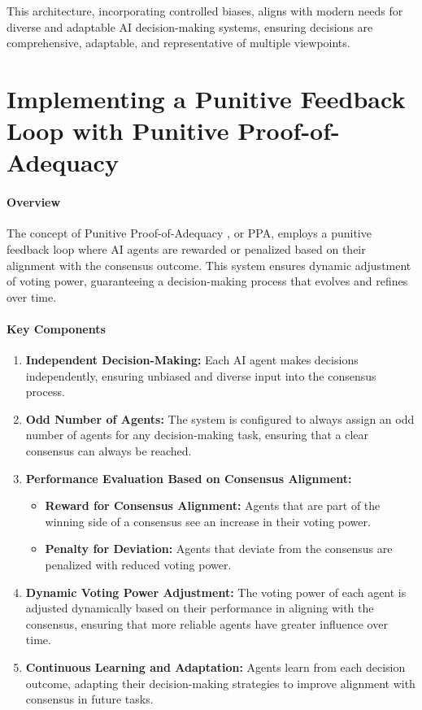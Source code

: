 \documentclass{article}
\begin{document}
This architecture, incorporating controlled biases, aligns with modern
needs for diverse and adaptable AI decision-making systems, ensuring
decisions are comprehensive, adaptable, and representative of multiple
viewpoints.

\hypertarget{implementing-a-punitive-feedback-loop-with-punitive-proof-of-adequacy}{%
\section*{Implementing a Punitive Feedback Loop with Punitive
Proof-of-Adequacy}\label{implementing-a-punitive-feedback-loop-with-punitive-proof-of-adequacy}}

\hypertarget{overview-1}{%
\paragraph{Overview}\label{overview-1}}

The concept of Punitive Proof-of-Adequacy , or PPA, employs a punitive
feedback loop where AI agents are rewarded or penalized based on their
alignment with the consensus outcome. This system ensures dynamic
adjustment of voting power, guaranteeing a decision-making process that
evolves and refines over time.

\hypertarget{key-components}{%
\paragraph{Key Components}\label{key-components}}

\begin{enumerate}
\def\labelenumi{\arabic{enumi}.}
\item
  \textbf{Independent Decision-Making:} Each AI agent makes decisions
  independently, ensuring unbiased and diverse input into the consensus
  process.
\item
  \textbf{Odd Number of Agents:} The system is configured to always
  assign an odd number of agents for any decision-making task, ensuring
  that a clear consensus can always be reached.
\item
  \textbf{Performance Evaluation Based on Consensus Alignment:}

  \begin{itemize}
  \item
    \textbf{Reward for Consensus Alignment:} Agents that are part of the
    winning side of a consensus see an increase in their voting power.
  \item
    \textbf{Penalty for Deviation:} Agents that deviate from the
    consensus are penalized with reduced voting power.
  \end{itemize}
\item
  \textbf{Dynamic Voting Power Adjustment:} The voting power of each
  agent is adjusted dynamically based on their performance in aligning
  with the consensus, ensuring that more reliable agents have greater
  influence over time.
\item
  \textbf{Continuous Learning and Adaptation:} Agents learn from each
  decision outcome, adapting their decision-making strategies to improve
  alignment with consensus in future tasks.
\end{enumerate}
\end{document}

